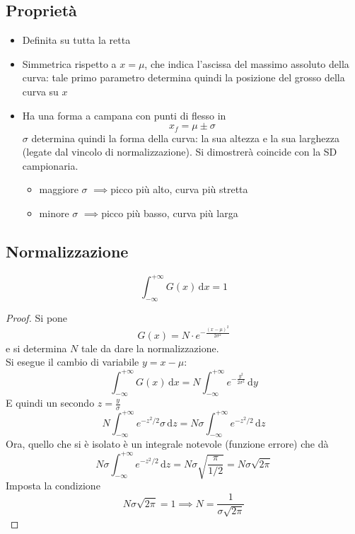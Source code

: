 \documentclass[10pt, oneside]{book}
\newcommand{\ds}{\displaystyle}
\newcommand{\imp}{$\implies$}
\begin{document}
\subsection{Proprietà}
\begin{itemize}
\item Definita su tutta la retta
\item Simmetrica rispetto a $x = \mu$, che indica l'ascissa del massimo assoluto della curva: tale primo parametro determina quindi la posizione del grosso della curva su $x$
\item Ha una forma a campana con punti di flesso in
\[x_f = \mu \pm \sigma\]
$\sigma$ determina quindi la forma della curva: la sua altezza e la sua larghezza (legate dal vincolo di normalizzazione). Si dimostrerà coincide con la SD campionaria.
\begin{itemize}
\item maggiore $\sigma$ \imp picco più alto, curva più stretta
\item minore $\sigma$ \imp picco più basso, curva più larga
\end{itemize}
\end{itemize}

\subsection{Normalizzazione}
\[\int_{-\infty}^{+\infty} G(x) \, \mathrm{d}x = 1\]
\begin{proof}
Si pone
\[G(x) = N \cdot e^{\displaystyle - \frac{(x - \mu)^2}{2 \sigma^2}}\]
e si determina $N$ tale da dare la normalizzazione.\\
Si esegue il cambio di variabile $y = x - \mu$:
\[\int_{-\infty}^{+\infty} G(x) \, \mathrm{d}x = N \int_{-\infty}^{+\infty} e^{\displaystyle - \frac{y^2}{2 \sigma^2}} \, \mathrm{d}y\]
E quindi un secondo $\ds z = \frac{y}{\sigma}$
\[N \int_{-\infty}^{+\infty} e^{- z^2/2} \sigma \, \mathrm{d}z = N \sigma \int_{-\infty}^{+\infty} e^{- z^2/2} \, \mathrm{d}z\]
Ora, quello che si è isolato è un integrale notevole (funzione errore) che dà
\[N \sigma \int_{-\infty}^{+\infty} e^{- z^2/2} \, \mathrm{d}z = N \sigma \sqrt{\frac{\pi}{1/2}} = N \sigma \sqrt{2 \pi}\]
Imposta la condizione
\[N \sigma \sqrt{2 \pi} = 1 \implies N = \frac{1}{\sigma \sqrt{2 \pi}}\]
\end{proof}
\end{document}
